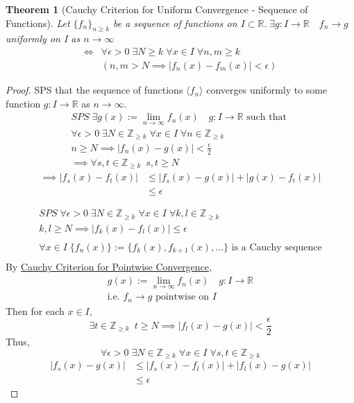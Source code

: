 \documentclass[11pt, oneside]{book}
\theoremstyle{break}
\newtheorem{thm}{Theorem}[section]
\newtheorem*{proof}{Proof}
\newcommand{\bb}[1]{\mathbb{#1}}			%
\begin{document}
\begin{thm}[Cauchy Criterion for Uniform Convergence - Sequence of Functions]
	Let $\{f_n\}_{n \geq k}$ be a sequence of functions on $I \subset \bb{R}. \; \exists g: I \to \bb{R} \quad f_n \to g$ uniformly on I as $n \to \infty$ 
	\begin{align*}
		\iff &\forall \epsilon > 0 \; \exists N \geq k \; \forall x \in I \; \forall n, m \geq k \; \\
			 &( n, m > N \implies |f_n(x) - f_m(x)| < \epsilon )
	\end{align*}
\end{thm}

\begin{proof}
	SPS that the sequence of functions $\langle f_n \rangle$ converges uniformly to some function $g: I \to \bb{R}$ as $n \to \infty$.
	\begin{gather*}
		SPS \; \exists g(x) := \lim_{n \to \infty} f_n(x) \quad g: I \to \bb{R} \text{ such that } \\
		\forall \epsilon > 0 \; \exists N \in \bb{Z}_{\geq k} \; \forall x \in I \; \forall n \in \bb{Z}_{\geq k} \\
		n \geq N \implies |f_n(x) - g(x)| < \frac{\epsilon}{2} \\
		\implies \forall s, t \in \bb{Z}_{\geq k} \enspace s, t \geq N
	\end{gather*}
	\begin{align*}
		\implies |f_s(x) - f_t(x)| &\leq |f_s(x) - g(x)| + |g(x) - f_t(x)| \\
								   &\leq \epsilon
	\end{align*}

	\begin{gather*}
		SPS \; \forall \epsilon > 0 \; \exists N \in \bb{Z}_{\geq k} \; \forall x \in I \; \forall k, l \in \bb{Z}_{\geq k} \\
		k, l \geq N \implies |f_k(x) - f_l(x)| \leq \epsilon \\
		\\
		\forall x \in I \; \{f_n(x)\} := \{f_k(x), f_{k + 1}(x), ...\} \text{ is a Cauchy sequence} \\
	\end{gather*}
	By \hyperref[Cauchy_pointwise_seq_fn]{Cauchy Criterion for Pointwise Convergence},
	\begin{gather*}
		g(x) := \lim_{n \to \infty} f_n(x) \quad g:I \to \bb{R} \\
		\text{i.e. } f_n \to g \text{ pointwise on } I
	\end{gather*}
	Then for each $x \in I$,
	\begin{equation*}
		\exists t \in \bb{Z}_{\geq k} \enspace t \geq N \implies |f_l(x) - g(x)| < \frac{\epsilon}{2}
	\end{equation*}
	Thus,
	\[
		\forall \epsilon > 0 \; \exists N \in \bb{Z}_{\geq k} \; \forall x \in I \; \forall s, t \in \bb{Z}_{\geq k}
	\]
	\begin{align*}
		|f_s(x) - g(x)| &\leq |f_s(x) - f_l(x)| + |f_l(x) - g(x)| \\
						&\leq \epsilon
	\end{align*}
\end{proof}
\end{document}
